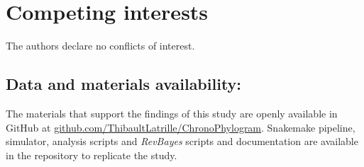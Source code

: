 \documentclass{article}
\begin{document}
\section*{Competing interests}
The authors declare no conflicts of interest.

\subsection*{Data and materials availability:}
The materials that support the findings of this study are openly available in GitHub at \href{https://github.com/ThibaultLatrille/ChronoPhylogram}{github.com/ThibaultLatrille/ChronoPhylogram}.
Snakemake pipeline, simulator, analysis scripts and \textit{RevBayes} scripts and documentation are available in the repository to replicate the study.
\end{document}
